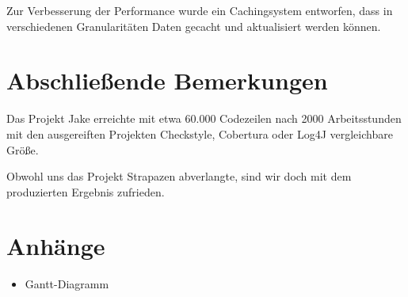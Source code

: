 Zur Verbesserung der Performance wurde ein Cachingsystem entworfen, dass in verschiedenen Granularitäten Daten gecacht und aktualisiert werden können.


\section{Abschließende Bemerkungen}
Das Projekt Jake erreichte mit etwa 60.000 Codezeilen nach 2000 Arbeitsstunden mit den ausgereiften Projekten Checkstyle, Cobertura oder Log4J vergleichbare Größe.

Obwohl uns das Projekt Strapazen abverlangte, sind wir doch mit dem produzierten Ergebnis zufrieden.

\section{Anhänge}
\begin{itemize}
\item Gantt-Diagramm
\end{itemize}


